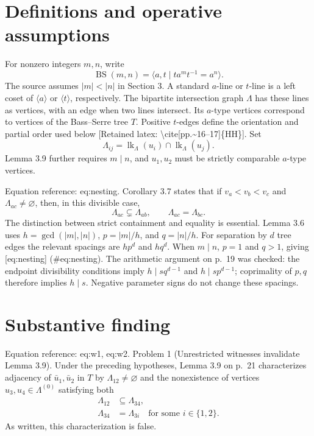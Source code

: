 \documentclass[10pt]{article}
\begin{document}
\section*{Definitions and operative assumptions}
For nonzero integers \(m,n\), write \[\operatorname{BS}(m,n)=\langle a,t\mid ta^mt^{-1}=a^n\rangle.\] The source assumes \(|m|<|n|\) in Section 3. A standard \(a\)-line or \(t\)-line is a left coset of \(\langle a\rangle\) or \(\langle t\rangle\), respectively. The bipartite intersection graph \(\Lambda\) has these lines as vertices, with an edge when two lines intersect. Its \(a\)-type vertices correspond to vertices of the Bass–Serre tree \(T\). Positive \(t\)-edges define the orientation and partial order used below [Retained latex: \textbackslash{}cite[pp.\textasciitilde{}16--17]\{HH\}]. Set \[\Lambda_{ij}=\operatorname{lk}_\Lambda(u_i)\cap\operatorname{lk}_\Lambda(u_j).\] Lemma 3.9 further requires \(m\mid n\), and \(u_1,u_2\) must be strictly comparable \(a\)-type vertices.\par
Equation reference: eq:nesting. Corollary 3.7 states that if \(v_a<v_b<v_c\) and \(\Lambda_{ac}\ne\varnothing\), then, in this divisible case, \[
 \Lambda_{ac}\subsetneq\Lambda_{ab},\qquad
 \Lambda_{ac}=\Lambda_{bc}.\] The distinction between strict containment and equality is essential. Lemma 3.6 uses \(h=\gcd(|m|,|n|)\), \(p=|m|/h\), and \(q=|n|/h\). For separation by \(d\) tree edges the relevant spacings are \(hp^d\) and \(hq^d\). When \(m\mid n\), \(p=1\) and \(q>1\), giving [eq:nesting] (\#eq:nesting). The arithmetic argument on p. 19 was checked: the endpoint divisibility conditions imply \(h\mid s q^{d-1}\) and \(h\mid s p^{d-1}\); coprimality of \(p,q\) therefore implies \(h\mid s\). Negative parameter signs do not change these spacings.\par
\section*{Substantive finding}
Equation reference: eq:w1, eq:w2. Problem 1 (Unrestricted witnesses invalidate Lemma 3.9).  Under the preceding hypotheses, Lemma 3.9 on p. 21 characterizes adjacency of \(\bar u_1,\bar u_2\) in \(T\) by \(\Lambda_{12}\ne\varnothing\) and the nonexistence of vertices \(u_3,u_4\in\Lambda^{(0)}\) satisfying both \[\begin{aligned}
 \Lambda_{12}&\subseteq\Lambda_{34}, \\
 \Lambda_{34}&=\Lambda_{3i}\quad\text{for some }i\in\{1,2\}. \end{aligned}\] As written, this characterization is false.\par
\end{document}

